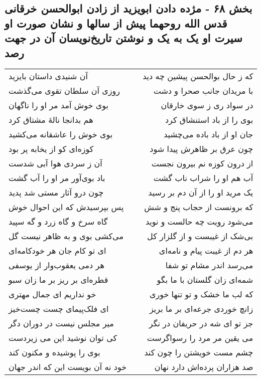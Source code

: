 \begin{center}
\section*{بخش ۶۸ - مژده دادن ابویزید از زادن ابوالحسن خرقانی قدس الله روحهما پیش از سالها  و نشان صورت او سیرت او یک به یک و  نوشتن تاریخ‌نویسان آن در جهت رصد}
\label{sec:sh068}
\begin{longtable}{l p{0.5cm} r}
آن شنیدی داستان بایزید
&&
که ز حال بوالحسن پیشین چه دید
\\
روزی آن سلطان تقوی می‌گذشت
&&
با مریدان جانب صحرا و دشت
\\
بوی خوش آمد مر او را ناگهان
&&
در سواد ری ز سوی خارقان
\\
هم بدانجا نالهٔ مشتاق کرد
&&
بوی را از باد استنشاق کرد
\\
بوی خوش را عاشقانه می‌کشید
&&
جان او از باد باده می‌چشید
\\
کوزه‌ای کو از یخابه پر بود
&&
چون عرق بر ظاهرش پیدا شود
\\
آن ز سردی هوا آبی شدست
&&
از درون کوزه نم بیرون نجست
\\
باد بوی‌آور مر او را آب گشت
&&
آب هم او را شراب ناب گشت
\\
چون درو آثار مستی شد پدید
&&
یک مرید او را از آن دم بر رسید
\\
پس بپرسیدش که این احوال خوش
&&
که برونست از حجاب پنج و شش
\\
گاه سرخ و گاه زرد و گه سپید
&&
می‌شود رویت چه حالست و نوید
\\
می‌کشی بوی و به ظاهر نیست گل
&&
بی‌شک از غیبست و از گلزار کل
\\
ای تو کام جان هر خودکامه‌ای
&&
هر دم از غیبت پیام و نامه‌ای
\\
هر دمی یعقوب‌وار از یوسفی
&&
می‌رسد اندر مشام تو شفا
\\
قطره‌ای بر ریز بر ما زان سبو
&&
شمه‌ای زان گلستان با ما بگو
\\
خو نداریم ای جمال مهتری
&&
که لب ما خشک و تو تنها خوری
\\
ای فلک‌پیمای چست چست‌خیز
&&
زانچ خوردی جرعه‌ای بر ما بریز
\\
میر مجلس نیست در دوران دگر
&&
جز تو ای شه در حریفان در نگر
\\
کی توان نوشید این می زیردست
&&
می یقین مر مرد را رسواگرست
\\
بوی را پوشیده و مکنون کند
&&
چشم مست خویشتن را چون کند
\\
خود نه آن بویست این که اندر جهان
&&
صد هزاران پرده‌اش دارد نهان
\\

\end{longtable}
\end{center}
